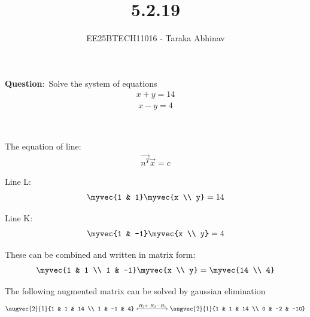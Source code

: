 \documentclass[journal]{IEEEtran}
\begin{document}

\vspace{3cm}

\title{5.2.19}
\author{EE25BTECH11016 - Taraka Abhinav}
\maketitle
{\let\newpage\relax\maketitle}

\renewcommand{\thefigure}{\theenumi}
\renewcommand{\thetable}{\theenumi}
\setlength{\intextsep}{10pt}

\renewcommand{\thetable}{\theenumi}

\textbf{Question}:\ 
Solve the system of equations
\begin{align}
x + y = 14
\end{align}
\begin{align}
x - y = 4
\end{align}

\solution \

The equation of line:
\begin{align}
\vec{n^T}\vec{x}=c
\end{align}

Line L:
\begin{align}
\myvec{1 & 1}\myvec{x \\ y}=14
\end{align}

Line K:
\begin{align}
\myvec{1 & -1}\myvec{x \\ y}=4
\end{align}

These can be combined and written in matrix form:
\begin{align}
\myvec{1 & 1 \\ 1 & -1}\myvec{x \\ y} = \myvec{14 \\ 4}
\end{align}

The following augmented matrix can be solved by gaussian elimination
\begin{align}
\augvec{2}{1}{1 & 1 & 14 \\ 1 & -1 & 4}
\xleftrightarrow{R_2 \leftarrow R_2 - R_1}
\augvec{2}{1}{1 & 1 & 14 \\ 0 & -2 & -10}
\end{align}
\end{document}

